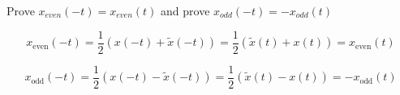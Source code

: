     \begin{example}
        Prove $x_{even} (-t) = x_{even} (t)$ and prove $x_{odd} (-t) = - x_{odd} (t)$

        \[
        x_{\text{even}}(-t) = \frac{1}{2}(x(-t) + \tilde{x}(-t)) = \frac{1}{2}(\tilde{x}(t) + x(t)) = x_{\text{even}}(t)
        \]

        \[
        x_{\text{odd}}(-t) = \frac{1}{2}(x(-t) - \tilde{x}(-t)) = \frac{1}{2}(\tilde{x}(t) - x(t)) = -x_{\text{odd}}(t)
        \]
    \end{example}

    \begin{example}
    \end{example}
    

